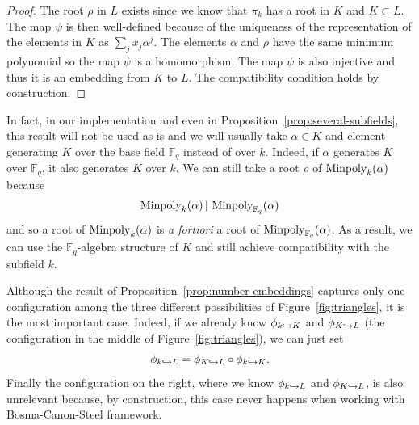   \begin{proof}
    The root $\rho$ in $L$ exists since we know that $\pi_k$ has a root in $K$
    and $K\subset L$. The map $\psi$ is then well-defined because of the uniqueness of the
    representation of the elements in $K$ as $\sum_jx_j\alpha^j$. The elements
    $\alpha$ and $\rho$ have the same minimum polynomial so the map $\psi$ is a
    homomorphism. The map $\psi$ is also injective and thus it is an embedding
    from $K$ to $L$. The compatibility condition holds by construction.
  \end{proof}
  \begin{rem}
    \label{rem:base-field}
   In fact, in our implementation and even in
   Proposition~\ref{prop:several-subfields}, this result will not be used as is and
   we will usually take $\alpha\in K$ and element generating $K$ over the base
   field $\mathbb{F}_q$ instead of over $k$. Indeed, if $\alpha$ generates $K$
   over $\mathbb{F}_q$, it also generates $K$ over $k$. We can still take a root
   $\rho$ of $\operatorname{Minpoly}_{k}(\alpha)$ because
   \[
     \operatorname{Minpoly}_k(\alpha)\,|\,\operatorname{Minpoly}_{\mathbb{F}_q}(\alpha)
   \]
   and so a root of $\operatorname{Minpoly}_{k}(\alpha)$ is \emph{a fortiori} a root of
   $\operatorname{Minpoly}_{\mathbb{F}_q}(\alpha)$. As a result, we can use the
   $\mathbb{F}_q$-algebra structure of $K$ and still achieve compatibility with
   the subfield $k$.
  \end{rem}
  Although the result of Proposition~\ref{prop:number-embeddings} captures only
  one configuration among the three different possibilities of
  Figure~\ref{fig:triangles}, it is the most important case. Indeed, if we
  already know $\phi_{k\hookrightarrow K}$ and $\phi_{K\hookrightarrow L}$ (the configuration in the
  middle of Figure~\ref{fig:triangles}), we can just set
  \[
    \phi_{k\hookrightarrow L} = \phi_{K\hookrightarrow L}\circ\phi_{k\hookrightarrow K}.
  \]
  Finally the configuration on the right, where we know $\phi_{k\hookrightarrow L}$ and
  $\phi_{K\hookrightarrow L}$, is also unrelevant because, by construction, this case never
  happens when working with Bosma-Canon-Steel framework.

